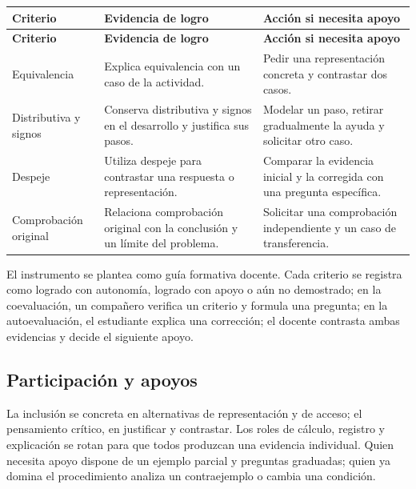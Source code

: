 \documentclass[spanish,letterpaper,oneside]{article}
\begin{document}
{\small{}\renewcommand{\arraystretch}{1.25}
\begin{longtable}{|>{\raggedright\arraybackslash}p{}|>{\raggedright\arraybackslash}p{}|>{\raggedright\arraybackslash}p{}|}\hline
\rowcolor{iiiepePale} \textbf{Criterio} & \textbf{Evidencia de logro} & \textbf{Acción si necesita apoyo} \\\hline
\endfirsthead
\hline
\rowcolor{iiiepePale} \textbf{Criterio} & \textbf{Evidencia de logro} & \textbf{Acción si necesita apoyo} \\\hline
\endhead
Equivalencia & Explica equivalencia con un caso de la actividad. & Pedir una representación concreta y contrastar dos casos. \\\hline
Distributiva y signos & Conserva distributiva y signos en el desarrollo y justifica sus pasos. & Modelar un paso, retirar gradualmente la ayuda y solicitar otro caso. \\\hline
Despeje & Utiliza despeje para contrastar una respuesta o representación. & Comparar la evidencia inicial y la corregida con una pregunta específica. \\\hline
Comprobación original & Relaciona comprobación original con la conclusión y un límite del problema. & Solicitar una comprobación independiente y un caso de transferencia. \\\hline
\end{longtable}}
El instrumento se plantea como guía formativa docente. Cada criterio se registra como logrado con autonomía, logrado con apoyo o aún no demostrado; en la coevaluación, un compañero verifica un criterio y formula una pregunta; en la autoevaluación, el estudiante explica una corrección; el docente contrasta ambas evidencias y decide el siguiente apoyo.\subsection{Participación y apoyos}
La inclusión se concreta en alternativas de representación y de acceso; el pensamiento crítico, en justificar y contrastar. Los roles de cálculo, registro y explicación se rotan para que todos produzcan una evidencia individual. Quien necesita apoyo dispone de un ejemplo parcial y preguntas graduadas; quien ya domina el procedimiento analiza un contraejemplo o cambia una condición.
\end{document}
